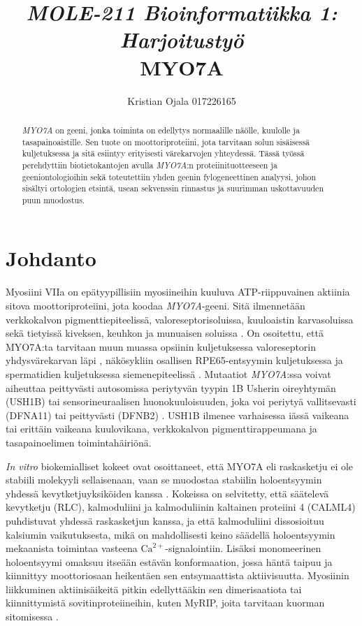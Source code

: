 \documentclass[a4paper,11pt,notitlepage]{article}
\title{\textit{\normalsize MOLE-211 Bioinformatiikka 1: Harjoitustyö}\\ \textbf{MYO7A}}
\author{Kristian Ojala 017226165}
\date{}
\begin{document}
\maketitle

\renewcommand{\abstractname}{Tiivistelmä}
\begin{abstract}
\textit{MYO7A} on geeni, jonka toiminta on edellytys normaalille näölle, kuulolle ja tasapainoaistille. Sen tuote on moottoriproteiini, jota tarvitaan solun sisäisessä kuljetuksessa ja sitä esiintyy erityisesti värekarvojen yhteydessä. Tässä työssä perehdyttiin biotietokantojen avulla \textit{MYO7A}:n proteiinituotteeseen ja geeniontologioihin sekä toteutettiin yhden geenin fylogeneettinen analyysi, johon sisältyi ortologien etsintä, usean sekvenssin rinnastus ja suurimman uskottavuuden puun muodostus. 
\end{abstract}

\section{Johdanto}
Myosiini VIIa on epätyypillisiin myosiineihin kuuluva ATP-riippuvainen aktiinia sitova moottoriproteiini, jota koodaa \textit{MYO7A}-geeni. Sitä ilmennetään verkkokalvon pigmenttiepiteelissä, valoreseptorisoluissa, kuuloaistin karvasoluissa sekä tietyissä kiveksen, keuhkon ja munuaisen soluissa \cite{hasson1995,liu1997}. On osoitettu, että MYO7A:ta tarvitaan muun muassa opsiinin kuljetuksessa valoreseptorin yhdysvärekarvan läpi \cite{liu1999}, näkösykliin osallisen RPE65-entsyymin kuljetuksessa \cite{lopes2011} ja spermatidien kuljetuksessa siemenepiteelissä \cite{wen2019}. Mutaatiot \textit{MYO7A}:ssa voivat aiheuttaa peittyvästi autosomissa periytyvän tyypin 1B Usherin oireyhtymän (USH1B) tai sensorineuraalisen huonokuuloisuuden, joka voi periytyä vallitsevasti (DFNA11) tai peittyvästi (DFNB2) \cite{riazuddin2008}. USH1B ilmenee varhaisessa iässä vaikeana tai erittäin vaikeana kuulovikana, verkkokalvon pigmenttirappeumana ja tasapainoelimen toimintahäiriönä.

\textit{In vitro} biokemialliset kokeet ovat osoittaneet, että MYO7A eli raskasketju ei ole stabiili molekyyli sellaisenaan, vaan se muodostaa stabiilin holoentsyymin yhdessä kevytketjuyksiköiden kanssa \cite{hollo2023}. Kokeissa on selvitetty, että säätelevä kevytketju (RLC), kalmoduliini ja kalmoduliinin kaltainen proteiini 4 (CALML4) puhdistuvat yhdessä raskasketjun kanssa, ja että kalmoduliini dissosioituu kalsiumin vaikutuksesta, mikä on mahdollisesti keino säädellä holoentsyymin mekaanista toimintaa vasteena $\textrm{Ca}^{2+}$-signaloin\-tiin. Lisäksi monomeerinen holoentsyymi omaksuu itseään estävän konformaation, jossa häntä taipuu ja kiinnittyy moottoriosaan heikentäen sen entsymaattista aktiivisuutta. Myosiinin liikkuminen aktiinisäikeitä pitkin edellyttääkin sen dimerisaatiota tai kiinnittymistä sovitinproteiineihin, kuten MyRIP, joita tarvitaan kuorman sitomisessa \cite{hollo2023}. 
\end{document}
